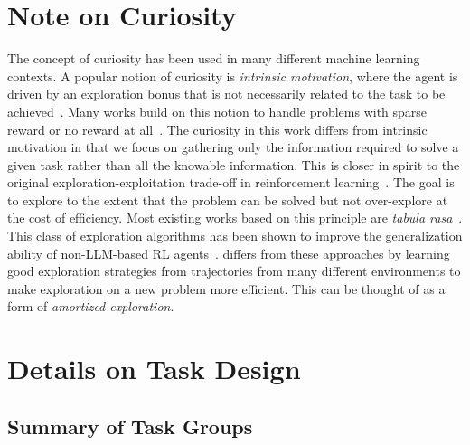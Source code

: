 \newpage
\appendix
\onecolumn

\section{Note on Curiosity} \label{section:appendix_note_on_curiosity}

The concept of curiosity has been used in many different machine learning contexts. A popular notion of curiosity is \emph{intrinsic motivation}, where the agent is driven by an exploration bonus that is not necessarily related to the task to be achieved~\citep{schmidhuber1991curious, schmidhuber2007godel}. Many works build on this notion to handle problems with sparse reward or no reward at all~\citep{pathak2017curiosity, eysenbach2018diversity, burda2018exploration, sharma2019dynamics, pathak2019self}. The curiosity in this work differs from intrinsic motivation in that we focus on gathering only the information required to solve a given task rather than all the knowable information. This is closer in spirit to the original exploration-exploitation trade-off in reinforcement learning~\citep{sutton1998reinforcement, auer2002finite, thompson1933likelihood}. The goal is to explore to the extent that the problem can be solved but not over-explore at the cost of efficiency. Most existing works based on this principle are \emph{tabula rasa}~\citep{osband2016deep, chen2017ucb}.
This class of exploration algorithms has been shown to improve the generalization ability of non-LLM-based RL agents~\citep{jiang2023importance}.
\ours{} differs from these approaches by learning good exploration strategies from trajectories from many different environments to make exploration on a new problem more efficient. This can be thought of as a form of \emph{amortized exploration}.




\section{Details on Task Design} \label{section:appendix_environment_design}

\subsection{Summary of Task Groups}

